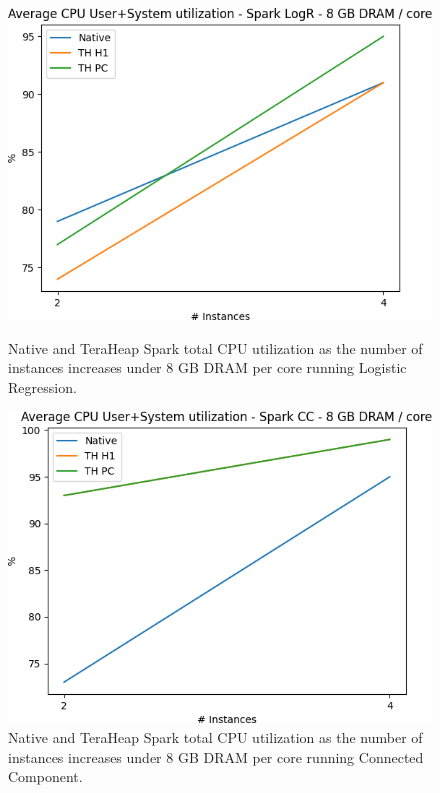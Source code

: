 \begin{figure}[thbp]
        \centering
        \includegraphics[width=\linewidth]{./fig/LOGR_64_UTIL.png}
    \caption{Native and TeraHeap Spark total CPU utilization
        as the number of instances increases under 8 GB DRAM per core running Logistic Regression.}
                \label{fig:logr_64_util}

        \includegraphics[width=\linewidth]{./fig/CC_64_UTIL.png}
    \caption{Native and TeraHeap Spark total CPU utilization
        as the number of instances increases under 8 GB DRAM per core running Connected Component.}
                \label{fig:cc_64_util}
\end{figure}

